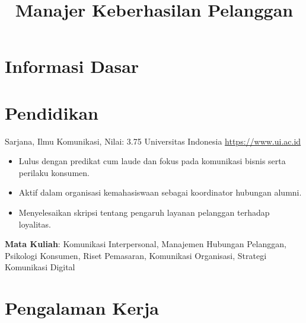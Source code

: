 \documentclass[a4paper, serif, 10pt]{moderncv}
\title{Manajer Keberhasilan Pelanggan}
\begin{document}
\maketitle

\section{Informasi Dasar}

\section{Pendidikan}

        {Sarjana, Ilmu Komunikasi, Nilai: 3.75}
        {Universitas Indonesia}
        {\url{https://www.ui.ac.id}}
        {}
        {\begin{itemize}
\item Lulus dengan predikat cum laude dan fokus pada komunikasi bisnis serta perilaku konsumen.
\item Aktif dalam organisasi kemahasiswaan sebagai koordinator hubungan alumni.
\item Menyelesaikan skripsi tentang pengaruh layanan pelanggan terhadap loyalitas.
\end{itemize}
\textbf{Mata Kuliah}: Komunikasi Interpersonal, Manajemen Hubungan Pelanggan, Psikologi Konsumen, Riset Pemasaran, Komunikasi Organisasi, Strategi Komunikasi Digital}
\section{Pengalaman Kerja}
\end{document}
